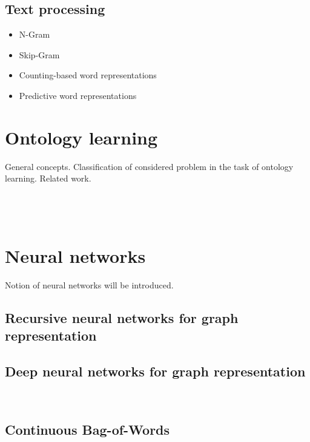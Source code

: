 \documentclass{scrartcl} %
\begin{document}
\subsection{Text processing}
\begin{itemize}
\item N-Gram \\
	\citeauthor{Jurafsky2014} \cite{Jurafsky2014}
\item Skip-Gram \\
	\citeauthor{Guthrie2006} \cite{Guthrie2006}
\item Counting-based word representations \\ 
	\citeauthor{Levy2015} \cite{Levy2015}
\item Predictive word representations \\
	\citeauthor{Levy2015} \cite{Levy2015}
\end{itemize}

\section{Ontology learning}
General concepts. Classification of considered problem in the task of ontology learning. Related work.\\
\citeauthor{Cimiano2009} \cite{Cimiano2009}\\
\citeauthor{Wong2012} \cite{Wong2012}\\
\citeauthor{dAmato16} \cite{dAmato16}\\
\citeauthor{Petrucci16} \cite{Petrucci16}

\section{Neural networks}
Notion of neural networks will be introduced.

\subsection{Recursive neural networks for graph representation}
\citeauthor{Scarselli2009} \cite{Scarselli2009}
\subsection{Deep neural networks for graph representation}
\citeauthor{Cao2016} \cite{Cao2016} \\
\citeauthor{Raghu2016} \cite{Raghu2016}
\subsection{Continuous Bag-of-Words}
\citeauthor{Mikolov2013} \cite{Mikolov2013}
\end{document}
